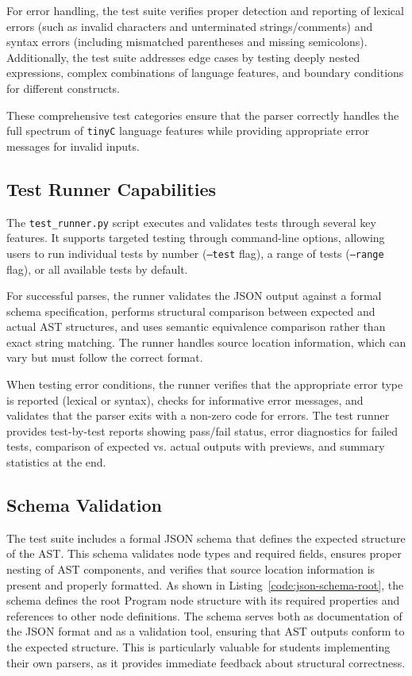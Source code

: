 For error handling, the test suite verifies proper detection and reporting of lexical errors (such as invalid characters and unterminated strings/comments) and syntax errors (including mismatched parentheses and missing semicolons). Additionally, the test suite addresses edge cases by testing deeply nested expressions, complex combinations of language features, and boundary conditions for different constructs.

These comprehensive test categories ensure that the parser correctly handles the full spectrum of \texttt{tinyC} language features while providing appropriate error messages for invalid inputs.

\subsection{Test Runner Capabilities}
The \texttt{test\_runner.py} script executes and validates tests through several key features. It supports targeted testing through command-line options, allowing users to run individual tests by number (\texttt{--test} flag), a range of tests (\texttt{--range} flag), or all available tests by default.

For successful parses, the runner validates the JSON output against a formal schema specification, performs structural comparison between expected and actual AST structures, and uses semantic equivalence comparison rather than exact string matching. The runner handles source location information, which can vary but must follow the correct format.

When testing error conditions, the runner verifies that the appropriate error type is reported (lexical or syntax), checks for informative error messages, and validates that the parser exits with a non-zero code for errors. The test runner provides test-by-test reports showing pass/fail status, error diagnostics for failed tests, comparison of expected vs. actual outputs with previews, and summary statistics at the end.

\subsection{Schema Validation}
The test suite includes a formal JSON schema that defines the expected structure of the AST. This schema validates node types and required fields, ensures proper nesting of AST components, and verifies that source location information is present and properly formatted. As shown in Listing~\ref{code:json-schema-root}, the schema defines the root Program node structure with its required properties and references to other node definitions. The schema serves both as documentation of the JSON format and as a validation tool, ensuring that AST outputs conform to the expected structure. This is particularly valuable for students implementing their own parsers, as it provides immediate feedback about structural correctness.

